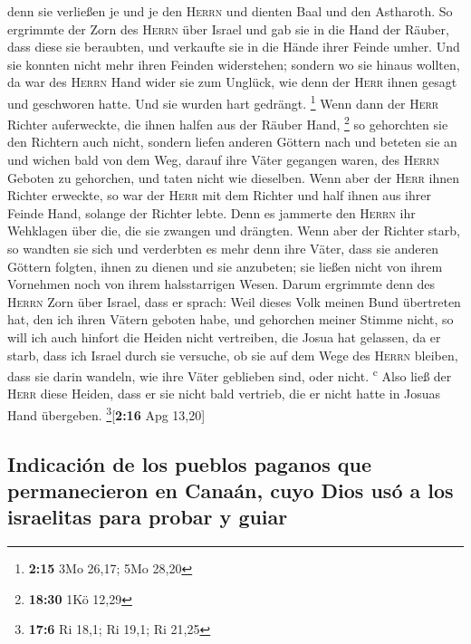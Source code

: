  denn sie verließen je und je den \textsc{Herrn} und
dienten Baal und den Astharoth.  So ergrimmte der Zorn
des \textsc{Herrn} über Israel und gab sie in die Hand der Räuber, dass
diese sie beraubten, und verkaufte sie in die Hände ihrer Feinde umher.
Und sie konnten nicht mehr ihren Feinden widerstehen; 
sondern wo sie hinaus wollten, da war des \textsc{Herrn} Hand wider sie
zum Unglück, wie denn der \textsc{Herr} ihnen gesagt und geschworen
hatte. Und sie wurden hart gedrängt. \footnote{\textbf{2:15} 3Mo 26,17;
  5Mo 28,20}  Wenn dann der \textsc{Herr} Richter
auferweckte, die ihnen halfen aus der Räuber Hand, \footnote{\textbf{18:30}
  1Kö 12,29}  so gehorchten sie den Richtern auch nicht,
sondern liefen anderen Göttern nach und beteten sie an und wichen bald
von dem Weg, darauf ihre Väter gegangen waren, des \textsc{Herrn}
Geboten zu gehorchen, und taten nicht wie dieselben. 
Wenn aber der \textsc{Herr} ihnen Richter erweckte, so war der
\textsc{Herr} mit dem Richter und half ihnen aus ihrer Feinde Hand,
solange der Richter lebte. Denn es jammerte den \textsc{Herrn} ihr
Wehklagen über die, die sie zwangen und drängten.  Wenn
aber der Richter starb, so wandten sie sich und verderbten es mehr denn
ihre Väter, dass sie anderen Göttern folgten, ihnen zu dienen und sie
anzubeten; sie ließen nicht von ihrem Vornehmen noch von ihrem
halsstarrigen Wesen.  Darum ergrimmte denn des
\textsc{Herrn} Zorn über Israel, dass er sprach: Weil dieses Volk meinen
Bund übertreten hat, den ich ihren Vätern geboten habe, und gehorchen
meiner Stimme nicht,  so will ich auch hinfort die Heiden
nicht vertreiben, die Josua hat gelassen, da er starb, 
dass ich Israel durch sie versuche, ob sie auf dem Wege des
\textsc{Herrn} bleiben, dass sie darin wandeln, wie ihre Väter geblieben
sind, oder nicht. \textsuperscript{c}  Also ließ der
\textsc{Herr} diese Heiden, dass er sie nicht bald vertrieb, die er
nicht hatte in Josuas Hand übergeben. \footnote{\textbf{17:6} Ri 18,1;
  Ri 19,1; Ri 21,25}{[}\textbf{2:16} Apg 13,20{]}

\hypertarget{indicaciuxf3n-de-los-pueblos-paganos-que-permanecieron-en-canauxe1n-cuyo-dios-usuxf3-a-los-israelitas-para-probar-y-guiar}{%
\subsection{Indicación de los pueblos paganos que permanecieron en
Canaán, cuyo Dios usó a los israelitas para probar y
guiar}\label{indicaciuxf3n-de-los-pueblos-paganos-que-permanecieron-en-canauxe1n-cuyo-dios-usuxf3-a-los-israelitas-para-probar-y-guiar}}

